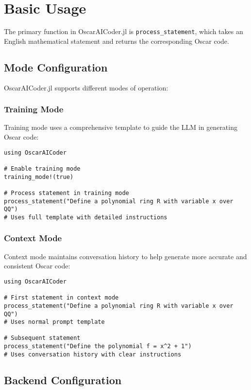 \documentclass[11pt,a4paper]{article}
\begin{document}
\section{Basic Usage}

The primary function in OscarAICoder.jl is \texttt{process\_statement}, which takes an English mathematical statement and returns the corresponding Oscar code.

\subsection{Mode Configuration}

OscarAICoder.jl supports different modes of operation:

\subsubsection{Training Mode}

Training mode uses a comprehensive template to guide the LLM in generating Oscar code:

\begin{lstlisting}
using OscarAICoder

# Enable training mode
training_mode!(true)

# Process statement in training mode
process_statement("Define a polynomial ring R with variable x over QQ")
# Uses full template with detailed instructions
\end{lstlisting}

\subsubsection{Context Mode}

Context mode maintains conversation history to help generate more accurate and consistent Oscar code:

\begin{lstlisting}
using OscarAICoder

# First statement in context mode
process_statement("Define a polynomial ring R with variable x over QQ")
# Uses normal prompt template

# Subsequent statement
process_statement("Define the polynomial f = x^2 + 1")
# Uses conversation history with clear instructions
\end{lstlisting}

\subsection{Backend Configuration}
\end{document}
